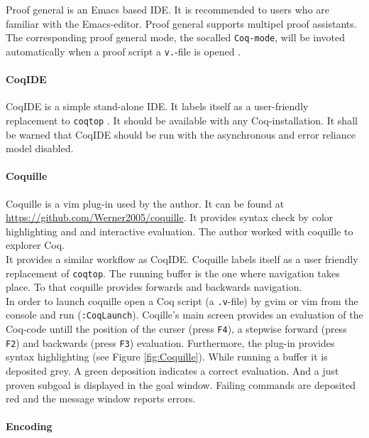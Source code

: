 Proof general is an Emacs based IDE. 
It is recommended to users who are familiar with the Emacs-editor.
Proof general supports multipel proof assistants. 
The corresponding proof general mode,  the socalled \lstinline!Coq-mode!, will be invoted automatically when a proof script a \lstinline!v.!-file is opened \cite{PROOFGENERAL}. 


\paragraph{CoqIDE}
\label{par:CoqIDE}

CoqIDE is a simple stand-alone IDE. 
It labels itself as a user-friendly replacement to \lstinline!coqtop! \cite{COQIDE}.   
It should be available with any Coq-installation. 
It shall be warned that CoqIDE should be run with the asynchronous and error reliance model disabled. 

\paragraph{Coquille}
\label{par:Coquille}

Coquille is a vim plug-in used by the author.
It can be found at \url{https://github.com/Werner2005/coquille}.
It provides syntax check by color highlighting and and interactive evaluation.  
The author worked with coquille to explorer Coq.\\
It provides a similar workflow as CoqIDE. 
Coquille labels itself as a user friendly  replacement of \lstinline!coqtop!. 
The running buffer is the one where navigation takes place. 
To that coquille provides forwards and backwards navigation.\\

In order to launch coquille open a Coq script (a \texttt{.v}-file) by gvim or vim from the console and run (\texttt{:CoqLaunch}). 
Coqille's main screen provides an evaluation of the Coq-code untill the position of the curser (press \texttt{F4}), a stepwise forward (press \texttt{F2}) and backwards (press \texttt{F3}) evaluation.                 
Furthermore, the plug-in provides syntax highlighting (see Figure \ref{fig:Coquille}).
While running a buffer it is deposited grey.
A green deposition indicates a correct evaluation. 
And a just proven subgoal is displayed in the goal window. 
Failing commands are deposited red and the message window reports errors.


\paragraph{Encoding}
\label{par:encoding}


